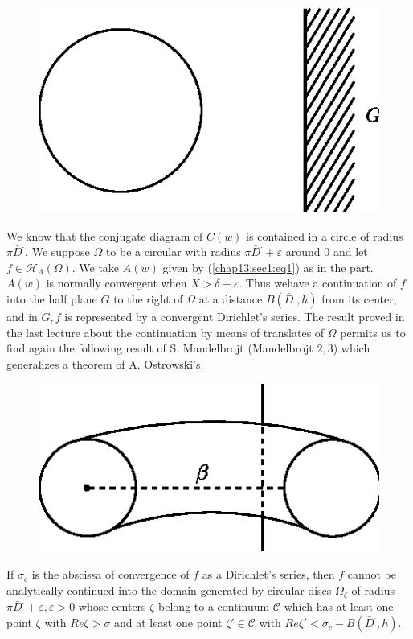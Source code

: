 \begin{figure}[H]
\centerline{\includegraphics{vol15-figures/fig15-8.eps}}
\end{figure}

We know that the conjugate diagram of $C (w)$ is contained in a circle
of radius $\pi \bar{D}^.$. We suppose $\Omega$ to be a circular with
radius $\pi \bar{D}^. + \varepsilon$ around $0$ and let $f \in
\mathscr{H}_\Lambda (\Omega)$. We take $A (w)$ given by
(\ref{chap13:sec1:eq1}) as in 
the part. $A (w)$ is normally convergent when $X > \delta +
\varepsilon$. Thus we\pageoriginale have a continuation of $f$ into the half plane
$G$ to the right of $\Omega$ at a distance $B (\bar{D}^., h)$ from its
center, and in $G, f$ is represented by a convergent Dirichlet's
series. The result proved in the last lecture about the continuation
by means of translates of $\Omega$ permits us to find again the
following result of S. Mandelbrojt (Mandelbrojt $2,3$) which
generalizes a theorem of A. Ostrowski's. 

\begin{figure}[H]
\centerline{\includegraphics{vol15-figures/fig15-9.eps}}
\end{figure}

\begin{theorem*}
 If $ \sigma_c$ is the abscissa of convergence of $f$ as a
 Dirichlet's series, then $f$ cannot be analytically continued into
 the domain generated by circular discs $\Omega_\zeta$ of radius $\pi
 \bar{D}^. + \varepsilon, \varepsilon > 0$ whose centers $\zeta$ belong
 to a continuum $\mathscr{C}$ which has at least one point $\zeta$
 with $Re \zeta > \sigma$ and at least one point $\zeta'
 \in \mathscr{C}$ with $Re \zeta ' < \sigma_c - B (\bar{D}^., h)$. 
\end{theorem*}

